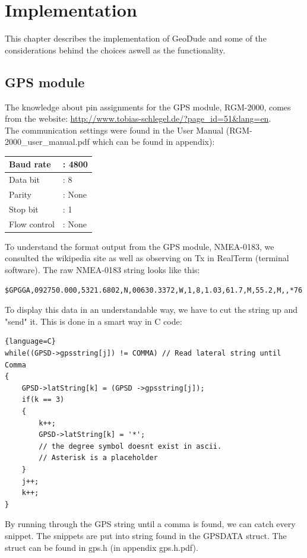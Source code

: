 \chapter{Implementation}
This chapter describes the implementation of GeoDude and some of the considerations behind the choices aswell as the functionality.

\section{GPS module}
The knowledge about pin assignments for the GPS module, RGM-2000, comes from the website: \url{http://www.tobias-schlegel.de/?page_id=51&lang=en}.\\
The communication settings were found in the User Manual (RGM-2000\_user\_manual.pdf which can be found in appendix):
\begin{table}[H]
    \begin{tabular}{|ll|}
    \hline
    Baud rate    & : 4800 \\ \hline
    Data bit     & : 8    \\ \hline
    Parity       & : None \\ \hline
    Stop bit     & : 1    \\ \hline
    Flow control & : None \\ \hline
    \end{tabular}
\end{table}
To understand the format output from the GPS module, NMEA-0183, we consulted the wikipedia site as well as observing on Tx in RealTerm (terminal software). The raw NMEA-0183 string looks like this:
\begin{verbatim}
$GPGGA,092750.000,5321.6802,N,00630.3372,W,1,8,1.03,61.7,M,55.2,M,,*76
\end{verbatim}
To display this data in an understandable way, we have to cut the string up and "send" it. This is done in a smart way in C code:
\begin{lstlisting}{language=C}
while((GPSD->gpsstring[j]) != COMMA) // Read lateral string until Comma
{
	GPSD->latString[k] = (GPSD ->gpsstring[j]);
	if(k == 3)
	{
		k++;
		GPSD->latString[k] = '*';   
		// the degree symbol doesnt exist in ascii. 
		// Asterisk is a placeholder
	}
	j++;
	k++;
}
\end{lstlisting}
By running through the GPS string until a comma is found, we can catch every snippet. The snippets are put into string found in the GPSDATA struct. The struct can be found in gps.h (in appendix gps.h.pdf).

